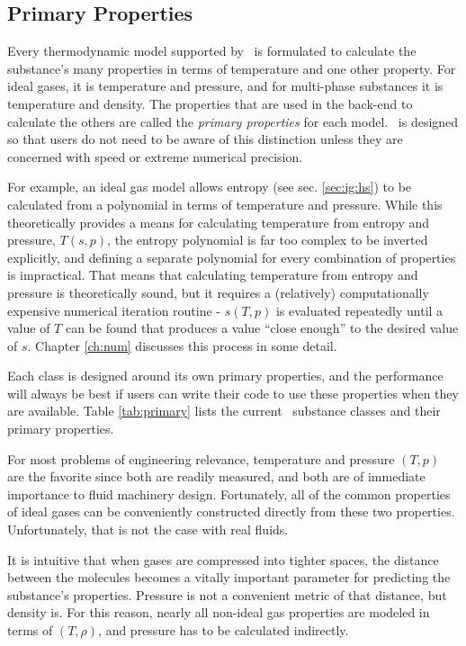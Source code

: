 \subsection{Primary Properties}\label{sec:intro:primary}

Every thermodynamic model supported by \PM\ is formulated to calculate the substance's many properties in terms of temperature and one other property.  For ideal gases, it is temperature and pressure, and for multi-phase substances it is temperature and density.  The properties that are used in the back-end to calculate the others are called the \emph{primary properties} for each model.  \PM\ is designed so that users do not need to be aware of this distinction unless they are concerned with speed or extreme numerical precision.

For example, an ideal gas model allows entropy (see sec. \ref{sec:ig:hs}) to be calculated from a polynomial in terms of temperature and pressure.  While this theoretically provides a means for calculating temperature from entropy and pressure, $T(s,p)$, the entropy polynomial is far too complex to be inverted explicitly, and defining a separate polynomial for every combination of properties is impractical.  That means that calculating temperature from entropy and pressure is theoretically sound, but it requires a (relatively) computationally expensive numerical iteration routine - $s(T,p)$ is evaluated repeatedly until a value of $T$ can be found that produces a value ``close enough'' to the desired value of $s$.  Chapter \ref{ch:num} discusses this process in some detail.

Each class is designed around its own primary properties, and the performance will always be best if users can write their code to use these properties when they are available.  Table \ref{tab:primary} lists the current \PM\ substance classes and their primary properties.

For most problems of engineering relevance, temperature and pressure $(T,p)$ are the favorite since both are readily measured, and both are of immediate importance to fluid machinery design.  Fortunately, all of the common properties of ideal gases can be conveniently constructed directly from these two properties.  Unfortunately, that is not the case with real fluids.

It is intuitive that when gases are compressed into tighter spaces, the distance between the molecules becomes a vitally important parameter for predicting the substance's properties.  Pressure is not a convenient metric of that distance, but density is.  For this reason, nearly all non-ideal gas properties are modeled in terms of $(T,\rho)$, and pressure has to be calculated indirectly. 

